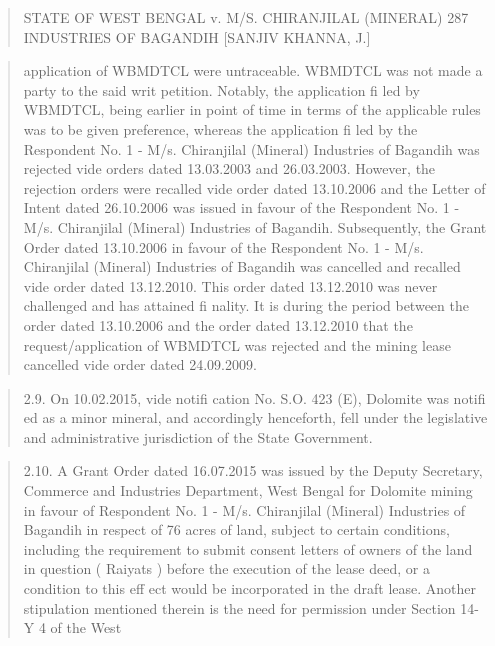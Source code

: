 \documentclass[12pt,a4paper]{article}
\newenvironment{judgequote}
  {\begin{quote}\small}
  {\end{quote}}
\begin{document}
\begin{judgequote}
STATE OF WEST BENGAL v. M/S. CHIRANJILAL (MINERAL) 287
INDUSTRIES OF BAGANDIH [SANJIV KHANNA, J.]
\end{judgequote}

\begin{judgequote}
application of WBMDTCL were untraceable. WBMDTCL was not made a
party to the said writ petition. Notably, the application fi led by WBMDTCL,
being earlier in point of time in terms of the applicable rules was to be given
preference, whereas the application fi led by the Respondent No. 1 - M/s.
Chiranjilal (Mineral) Industries of Bagandih was rejected vide orders dated
13.03.2003 and 26.03.2003. However, the rejection orders were recalled vide
order dated 13.10.2006 and the Letter of Intent dated 26.10.2006 was issued
in favour of the Respondent No. 1 - M/s. Chiranjilal (Mineral) Industries
of Bagandih. Subsequently, the Grant Order dated 13.10.2006 in favour of
the Respondent No. 1 - M/s. Chiranjilal (Mineral) Industries of Bagandih
was cancelled and recalled vide order dated 13.12.2010. This order dated
13.12.2010 was never challenged and has attained fi nality. It is during the
period between the order dated 13.10.2006 and the order dated 13.12.2010
that the request/application of WBMDTCL was rejected and the mining
lease cancelled vide order dated 24.09.2009.
\end{judgequote}

\begin{judgequote}
2.9. On 10.02.2015, vide notifi cation No. S.O. 423 (E), Dolomite
was notifi ed as a minor mineral, and accordingly henceforth, fell under the
legislative and administrative jurisdiction of the State Government.
\end{judgequote}

\begin{judgequote}
2.10. A Grant Order dated 16.07.2015 was issued by the Deputy
Secretary, Commerce and Industries Department, West Bengal for Dolomite
mining in favour of Respondent No. 1 - M/s. Chiranjilal (Mineral) Industries
of Bagandih in respect of 76 acres of land, subject to certain conditions,
including the requirement to submit consent letters of owners of the land
in question ( Raiyats ) before the execution of the lease deed, or a condition
to this eff ect would be incorporated in the draft lease. Another stipulation
mentioned therein is the need for permission under Section 14-Y 4 of the West
\end{judgequote}
\end{document}

